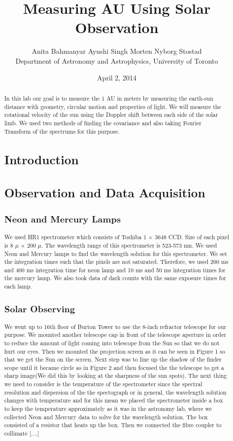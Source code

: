 \documentclass[letterpaper,12pt]{article}
\title{Measuring AU Using Solar Observation}
\author{Anita Bahmanyar \qquad Ayushi Singh \qquad Morten Nyborg Stostad \\Department of Astronomy and Astrophysics, University of Toronto}
\affil{\small {Written by: Anita Bahmanyar}}
\affil{\small {anita.bahmanyar@mail.utoronto.ca}}
\affil{\small {Student Number: 998909098}}
\date{April 2, 2014}
\begin{document}
\maketitle

\begin{abstract}
\label{abstract}
In this lab our goal is to measure the 1 AU in meters by measuring the earth-sun distance with geometry, circular motion and properties of light. We will measure the rotational velocity of the sun using the Doppler shift between each side of the solar limb. We used two methods of finding the covariance and also taking Fourier Transform of the spectrums for this purpose.



\section{Introduction}
\label{sec:introduction}

 
\section{Observation and Data Acquisition}
\label{sec:observationanddataacquisition}
\subsection{Neon and Mercury Lamps}
We used HR1 spectrometer which consists of Toshiba 1 $\times$ 3648 CCD. Size of each pixel is 8 $\mu$ $\times$ 200 $\mu$.  The wavelength range of this spectrometer is 523-573 nm. We used Neon and Mercury lamps to find the wavelength solution for this spectrometer. We set the integration times such that the pixels are not saturated. Therefore, we used 200 ms and 400 ms integration time for neon lamp and 10 ms and 50 ms integration times for the mercury lamp. We also took data of dark counts with the same exposure times for each lamp. 
\subsection{Solar Observing}
We went up to 16th floor of Burton Tower to use the 8-inch refractor telescope for our purpose. We mounted another telescope cap in front of the telescope aperture in order to reduce the amount of light coming into telescope from the Sun so that we do not hurt our eyes. Then we mounted the projection screen as it can be seen in Figure 1 so that we get the Sun on the screen. Next step was to line up the shadow of the finder scope until it became circle as in Figure 2 and then focused the the telescope to get a sharp image(We did this by looking at the sharpness of the sun spots). The next thing we need to consider is the temperature of the spectrometer since the spectral resolution and dispersion of the the spectograph or in general, the wavelength solution changes with temperature and for this mean we placed the spectrometer inside a box to keep the temperature approximately as it was in the astronomy lab, where we collected Neon and Mercury data to solve for the wavelength solution. The box consisted of a resistor that heats up the box. Then we connected the fibre coupler to collimate [....] 


\end{abstract}
\end{document}
